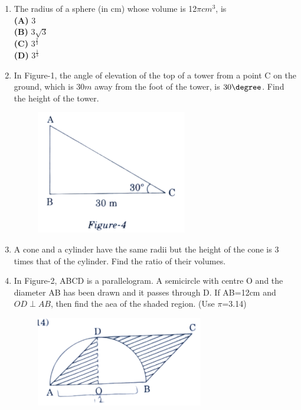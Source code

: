 \begin{enumerate}
\item The radius of a sphere (in cm) whose volume is 12$\pi cm^3$, is\\
\textbf{(A)} $3$\\
\textbf{(B)} $3 \sqrt{3}$\\
\textbf{(C)} $3^\frac{2}{3}$\\
\textbf{(D)} $3^\frac{1}{3}$\\
\item In Figure-1, the angle of elevation of the top of a tower from a point C on the ground, which is $30m$ away from the foot of the tower, is $30\degree$. Find the height of the tower.                                                                                                
	\begin{figure}[H]
		\centering                                                                        
  \includegraphics[width=0.5\columnwidth]{figs/Fig-4.png}           
  \caption{}                                                                        
  \label{}
	\end{figure}
\item A cone and a cylinder have the same radii but the height of the cone is 3 times that of the cylinder. Find the ratio of their volumes.\\
\item In Figure-2, ABCD is a parallelogram. A semicircle with centre O and the diameter AB has been drawn and it passes through D. If AB=12cm and $OD \perp AB$, then find the aea of the shaded region. (Use $\pi$=3.14)\\
          \begin{figure}[H]
                  \centering
                  \includegraphics[width=0.5\columnwidth]{figs/Fig-8.png}

\end{figure}
\end{enumerate}
